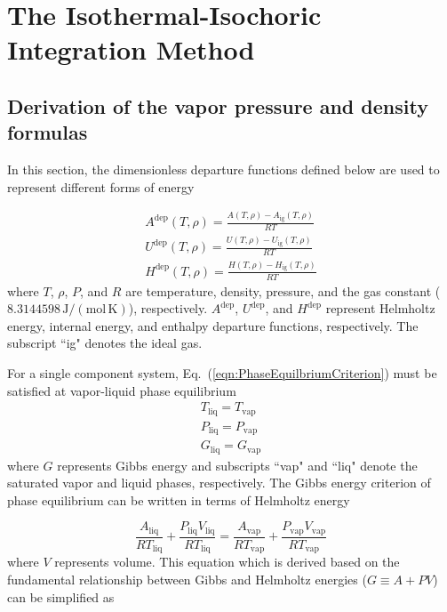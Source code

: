 \documentclass[5p,times]{elsarticle}
\begin{document}
\section{The Isothermal-Isochoric Integration Method} \label{sec:ITIC-method}
\subsection{Derivation of the vapor pressure and density formulas}
In this section, the dimensionless departure functions defined below are used to represent different forms of energy

\begin{equation}
\begin{array}{l}
{
A^\mathrm{dep}(T,\rho)=  \frac{A(T,\rho)-A_\mathrm{ig}(T,\rho)}{RT} 
}
\\
{
U^\mathrm{dep}(T,\rho)=  \frac{ U(T,\rho)-U_\mathrm{ig}(T,\rho)}{RT} 
}
\\
{
H^\mathrm{dep}(T,\rho)=  \frac{ H(T,\rho)-H_\mathrm{ig}(T,\rho)}{RT} 
}
\end{array} 
\label{eqn:DepDefinition}
\end{equation}
where $T$, $\rho$, $P$, and $R$ are temperature, density, pressure, and the gas constant ($8.3144598\,\mathrm{J/(mol\,K)}$), respectively. $A^\mathrm{dep}$, $U^\mathrm{dep}$, and $H^\mathrm{dep}$ represent Helmholtz energy, internal energy, and enthalpy departure functions, respectively. The subscript ``ig" denotes the ideal gas.

For a single component system, Eq.~(\ref{eqn:PhaseEquilbriumCriterion}) must be satisfied at vapor-liquid phase equilibrium
\begin{equation}
\begin{array}{l}
{T_\mathrm{liq} =T_\mathrm{vap} }\\
{P_\mathrm{liq} =P_\mathrm{vap} }\\
{G_\mathrm{liq} =G_\mathrm{vap} }
\end{array} 
\label{eqn:PhaseEquilbriumCriterion}
\end{equation}
where $G$ represents Gibbs energy and subscripts ``vap" and ``liq" denote the saturated vapor and liquid phases, respectively.  The Gibbs energy criterion of phase equilibrium can be written in terms of Helmholtz energy


\begin{equation}
\frac{A_\mathrm{liq}}{RT_\mathrm{liq}} + \frac{P_\mathrm{liq}V_\mathrm{liq}}{RT_\mathrm{liq}}=\frac{A_\mathrm{vap}}{RT_\mathrm{vap}} + \frac{P_\mathrm{vap}V_\mathrm{vap}}{RT_\mathrm{vap}}
\label{eqn:ACriterion}
\end{equation}
where $V$ represents volume. This equation which is derived based on the fundamental relationship between Gibbs and Helmholtz energies ($G \equiv A+PV$) can be simplified as 
\end{document}
